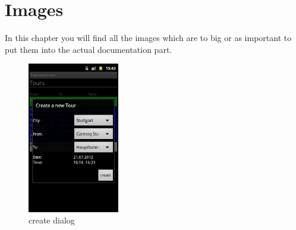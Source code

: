 \thispagestyle{fancy}

\chapter{Images}
In this chapter you will find all the images which are to big or as important to put them into the actual documentation part.

\clearpage

\begin{figure}[ht]
	\centering
	\includegraphics[width=4cm]{images/Tawuseldroid_create}
	\caption{create dialog}
	\label{img:AndCD}
\end{figure}

